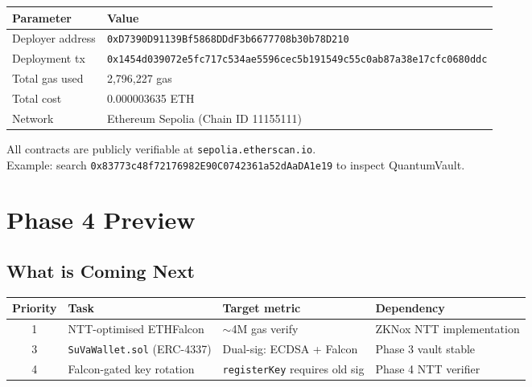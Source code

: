 \documentclass[11pt,a4paper]{article}
\begin{document}
\begin{center}
\begin{tabular}{ll}
\toprule
\textbf{Parameter} & \textbf{Value} \\
\midrule
Deployer address  & \texttt{0xD7390D91139Bf5868DDdF3b6677708b30b78D210} \\
Deployment tx     & \texttt{0x1454d039072e5fc717c534ae5596cec5b191549c55c0ab87a38e17cfc0680ddc} \\
Total gas used    & 2{,}796{,}227 gas \\
Total cost        & 0.000003635 ETH \\
Network           & Ethereum Sepolia (Chain ID 11155111) \\
\bottomrule
\end{tabular}
\end{center}

\begin{infobox}
All contracts are publicly verifiable at \texttt{sepolia.etherscan.io}.\\
Example: search \texttt{0x83773c48f72176982E90C0742361a52dAaDA1e19} to inspect QuantumVault.
\end{infobox}

\section{Phase 4 Preview}

\subsection{What is Coming Next}

\begin{center}
\begin{tabular}{clll}
\toprule
\textbf{Priority} & \textbf{Task} & \textbf{Target metric} & \textbf{Dependency} \\
\midrule
1 & NTT-optimised ETHFalcon & $\sim$4M gas verify & ZKNox NTT implementation \\
3 & \texttt{SuVaWallet.sol} (ERC-4337) & Dual-sig: ECDSA + Falcon & Phase 3 vault stable \\
4 & Falcon-gated key rotation & \texttt{registerKey} requires old sig & Phase 4 NTT verifier \\
\bottomrule
\end{tabular}
\end{center}
\end{document}
